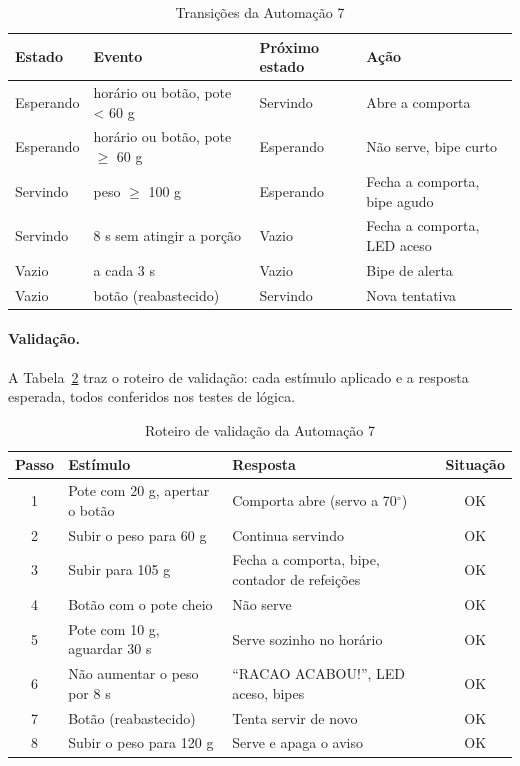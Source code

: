 \documentclass[12pt]{article}
\begin{document}
\begin{table}[ht]
\centering
\caption{Transições da Automação 7}\label{tab:est7}
\footnotesize
\begin{tabularx}{\textwidth}{lXlX}
\toprule
Estado & Evento & Próximo estado & Ação \\
\midrule
Esperando & horário ou botão, pote < 60 g & Servindo & Abre a comporta \\
Esperando & horário ou botão, pote $\geq$ 60 g & Esperando & Não serve, bipe curto \\
Servindo & peso $\geq$ 100 g & Esperando & Fecha a comporta, bipe agudo \\
Servindo & 8 s sem atingir a porção & Vazio & Fecha a comporta, LED aceso \\
Vazio & a cada 3 s & Vazio & Bipe de alerta \\
Vazio & botão (reabastecido) & Servindo & Nova tentativa \\
\bottomrule
\end{tabularx}
\end{table}

\paragraph{Validação.} A Tabela~\ref{tab:val7} traz o roteiro de validação: cada estímulo aplicado e a resposta esperada, todos conferidos nos testes de lógica.

\begin{table}[ht]
\centering
\caption{Roteiro de validação da Automação 7}\label{tab:val7}
\footnotesize
\begin{tabularx}{\textwidth}{cXXc}
\toprule
Passo & Estímulo & Resposta & Situação \\
\midrule
1 & Pote com 20 g, apertar o botão & Comporta abre (servo a 70$^\circ$) & OK \\
2 & Subir o peso para 60 g & Continua servindo & OK \\
3 & Subir para 105 g & Fecha a comporta, bipe, contador de refeições & OK \\
4 & Botão com o pote cheio & Não serve & OK \\
5 & Pote com 10 g, aguardar 30 s & Serve sozinho no horário & OK \\
6 & Não aumentar o peso por 8 s & ``RACAO ACABOU!'', LED aceso, bipes & OK \\
7 & Botão (reabastecido) & Tenta servir de novo & OK \\
8 & Subir o peso para 120 g & Serve e apaga o aviso & OK \\
\bottomrule
\end{tabularx}
\end{table}
\end{document}

